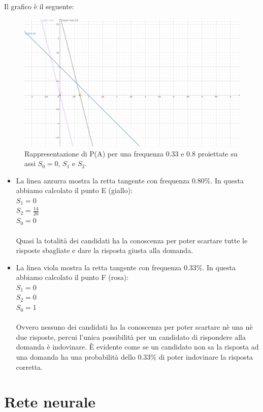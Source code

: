 \documentclass[11pt,a4paper,italian]{article}
\begin{document}
Il grafico \`e il seguente:

\begin{figure}[H]
\centering
	\includegraphics[width=0.90\linewidth]{image/esempio2.png}
	\caption{Rappresentazione di P(A) per una frequenza 0.33 e 0.8 proiettate su assi $S_0=0$, $S_1$ e $S_2$.}
\end{figure}

\begin{itemize}
\item La linea azzurra mostra la retta tangente con frequenza 0.80\%.
In questa abbiamo calcolato il punto E (giallo):\\
$S_1=0$\\
$S_2=\frac{14}{20}$\\
$S_0=0$\\
\\
Quasi la totalit\`a dei candidati ha la conoscenza per poter scartare tutte le risposte sbagliate e dare la risposta giusta alla domanda.
\item La linea viola mostra la retta tangente con frequenza 0.33\%.
In questa abbiamo calcolato il punto F (rosa):\\
$S_1=0$\\
$S_2=0$\\
$S_0=1$\\
\\ 
Ovvero nessuno dei candidati ha la conoscenza per poter scartare n\`e una n\`e due risposte, percui l'unica possibilit\`a per un candidato di rispondere alla domanda \`e indovinare. \`E evidente come se un candidato non sa la risposta ad una domanda ha una probabilit\`a dello 0.33\% di poter indovinare la risposta corretta.
\end{itemize}


\section{Rete neurale}
\label{Rete neurale}
\end{document}

